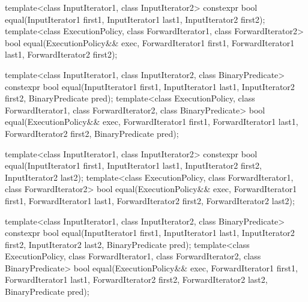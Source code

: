 %
\begin{itemdecl}
template<class InputIterator1, class InputIterator2>
  constexpr bool equal(InputIterator1 first1, InputIterator1 last1,
                       InputIterator2 first2);
template<class ExecutionPolicy, class ForwardIterator1, class ForwardIterator2>
  bool equal(ExecutionPolicy&& exec,
             ForwardIterator1 first1, ForwardIterator1 last1,
             ForwardIterator2 first2);

template<class InputIterator1, class InputIterator2,
         class BinaryPredicate>
  constexpr bool equal(InputIterator1 first1, InputIterator1 last1,
                       InputIterator2 first2, BinaryPredicate pred);
template<class ExecutionPolicy, class ForwardIterator1, class ForwardIterator2,
         class BinaryPredicate>
  bool equal(ExecutionPolicy&& exec,
             ForwardIterator1 first1, ForwardIterator1 last1,
             ForwardIterator2 first2, BinaryPredicate pred);

template<class InputIterator1, class InputIterator2>
  constexpr bool equal(InputIterator1 first1, InputIterator1 last1,
                       InputIterator2 first2, InputIterator2 last2);
template<class ExecutionPolicy, class ForwardIterator1, class ForwardIterator2>
  bool equal(ExecutionPolicy&& exec,
             ForwardIterator1 first1, ForwardIterator1 last1,
             ForwardIterator2 first2, ForwardIterator2 last2);

template<class InputIterator1, class InputIterator2,
         class BinaryPredicate>
  constexpr bool equal(InputIterator1 first1, InputIterator1 last1,
                       InputIterator2 first2, InputIterator2 last2,
                       BinaryPredicate pred);
template<class ExecutionPolicy, class ForwardIterator1, class ForwardIterator2,
         class BinaryPredicate>
  bool equal(ExecutionPolicy&& exec,
             ForwardIterator1 first1, ForwardIterator1 last1,
             ForwardIterator2 first2, ForwardIterator2 last2,
             BinaryPredicate pred);
\end{itemdecl}


